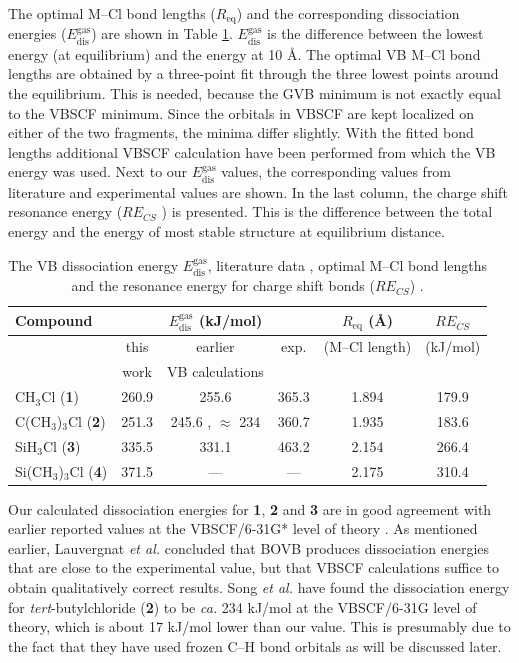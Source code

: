 The optimal M--Cl bond lengths ($R_\mathrm{eq}$) and the corresponding dissociation energies ($E_\mathrm{dis}^\mathrm{gas}$) are shown in Table \ref{ch3.tab.optimal}. $E_\mathrm{dis}^\mathrm{gas}$ is the difference between the lowest energy (at equilibrium) and the energy at 10 \AA. The optimal VB M--Cl bond lengths are obtained by a three-point fit through the three lowest points around the equilibrium. This is needed, because the GVB minimum is not exactly equal to the VBSCF minimum. Since the orbitals in VBSCF are kept localized on either of the two fragments, the minima differ slightly. With the fitted bond lengths additional VBSCF calculation have been performed from which the VB energy was used. Next to our $E_\mathrm{dis}^\mathrm{gas}$ values, the corresponding values from literature and experimental values \cite{lauvergnat,psu} are shown. In the last column, the charge shift resonance energy ($RE_{CS}$ \cite{cs1}) is presented. This is the difference between the total energy and the energy of most stable structure at equilibrium distance. 
\begin{table}[hbtp]
\center
\caption{The VB dissociation energy $E_\mathrm{dis}^\mathrm{gas}$, literature data \cite{lauvergnat,song,psu}, optimal M--Cl bond lengths and the resonance energy for charge shift bonds ($RE_{CS}$) \cite{cs1}.}
\begin{tabular}{|l|c|c|c|c|c|}
\hline
Compound & \multicolumn{3}{c|}{$E_\mathrm{dis}^\mathrm{gas}$ (kJ/mol)} & $R_\mathrm{eq}$ (\AA) & $RE_{CS}$ \\
\hline
&\multicolumn{1}{c|}{this} & \multicolumn{1}{c|}{earlier} & \multicolumn{1}{c|}{exp.} & (M--Cl length) & (kJ/mol) \\
&\multicolumn{1}{c|}{work} & \multicolumn{1}{c|}{VB calculations} & \multicolumn{1}{c|}{} & & \\
\hline
CH$_3$Cl (\textbf{1})& 260.9 & 255.6 \cite{lauvergnat} & 365.3 \cite{lauvergnat} & 1.894 & 179.9\\
C(CH$_3$)$_3$Cl (\textbf{2}) & 251.3 & 245.6 \cite{psu}, $\approx$ 234 \cite{song} & 360.7 \cite{psu} & 1.935 & 183.6\\
SiH$_3$Cl (\textbf{3})& 335.5 & 331.1 \cite{lauvergnat} & 463.2 \cite{lauvergnat} & 2.154 & 266.4\\
Si(CH$_3$)$_3$Cl (\textbf{4}) & 371.5 & --- & --- & 2.175 & 310.4\\
\hline
\end{tabular}
\label{ch3.tab.optimal}
\end{table}
Our calculated dissociation energies for \textbf{1}, \textbf{2} and \textbf{3} are in good agreement with earlier reported values at the VBSCF/6-31G* level of theory \cite{lauvergnat, psu}. As mentioned earlier, Lauvergnat \textit{et al.} \cite{lauvergnat} concluded that BOVB produces dissociation energies that are close to the experimental value, but that VBSCF calculations suffice to obtain qualitatively correct results. Song \textit{et al.} \cite{song} have found the dissociation energy for \textit{tert}-butylchloride (\textbf{2}) to be \textit{ca.} 234 kJ/mol at the VBSCF/6-31G level of theory, which is about 17 kJ/mol lower than our value. This is presumably due to the fact that they have used frozen C--H bond orbitals as will be discussed later.

